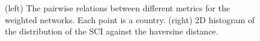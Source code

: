 \begin{figure}[h]
\begin{minipage}{0.5\textwidth}
        \label{fig:SCIdistance}
    \end{minipage}
    \vspace{-1cm}
    \caption{(left) The pairwise relations between different metrics for the weighted networks. Each point is a country. (right) 2D histogram of the distribution of the SCI against the haversine distance.}
    \label{fig:meta}
\end{figure}

\newpage